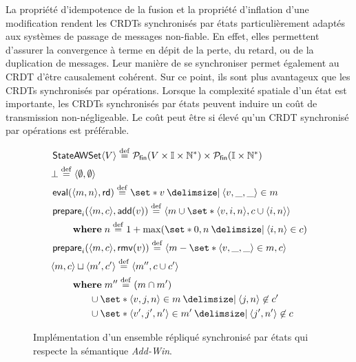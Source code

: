 
La propriété d'idempotence de la fusion et la propriété d'inflation d'une modification rendent les \acp{CRDT} synchronisés par états particulièrement adaptés aux systèmes de passage de messages non-fiable.
En effet, elles permettent d'assurer la convergence à terme en dépit de la perte, du retard, ou de la duplication de messages.
Leur manière de se synchroniser permet également au \ac{CRDT} d'être causalement cohérent.
Sur ce point, ils sont plus avantageux que les \acp{CRDT} synchronisés par opérations.
Lorsque la complexité spatiale d'un état est importante, les \acp{CRDT} synchronisés par états peuvent induire un coût de transmission non-négligeable.
Le coût peut être si élevé qu'un \ac{CRDT} synchronisé par opérations est préférable.

\begin{figure}[tb]
\centering
\begin{align*}
&\trm{StateAWSet}\tuple*{V} \defeq \powerfset{V \times \mathbb{I} \times \mathbb{N}^*} \times \powerfset{\mathbb{I} \times \mathbb{N}^*}\\
&\bot \defeq \tuple*{\emptyset, \emptyset}\\
&\trm{eval}(\tuple*{m, n}, \trm{rd}) \defeq \set*{v \given \tuple*{v, \_, \_} \in m}\\
&\begin{aligned}
\MoveEqLeft\trm{prepare}_i(\tuple*{m, c}, \trm{add}(v)) \defeq \tuple*{m \cup \set*{\tuple*{v, i, n}},c \cup \tuple*{i, n}}\\
    &\where n \defeq 1 + \max(\set*{0,n \given \tuple*{i, n} \in c})
\end{aligned}\\
&\trm{prepare}_i(\tuple*{m, c}, \trm{rmv}(v)) \defeq \tuple*{m \sminus \set*{\tuple*{v, \_,\_} \in m},c}\\
&\begin{aligned}
\MoveEqLeft \tuple*{m, c} \sqcup \tuple*{m', c'} \defeq \tuple*{m'', c \cup c'}\\
    &\begin{aligned}
    \MoveEqLeft\where m'' \defeq (m \cap m')\\
    &\cup \set*{\tuple*{v, j, n} \in m \given \tuple*{j, n} \not\in c'}\\
    &\cup \set*{\tuple*{v', j', n'} \in m' \given \tuple*{j', n'} \not\in c}
    \end{aligned}
\end{aligned}
\end{align*}
\caption[Implémentation d'un ensemble répliqué synchronisé par états]{Implémentation d'un ensemble répliqué synchronisé par états qui respecte la sémantique \emph{Add-Win}.}\label{fig:state-add-win-set}
\end{figure}

